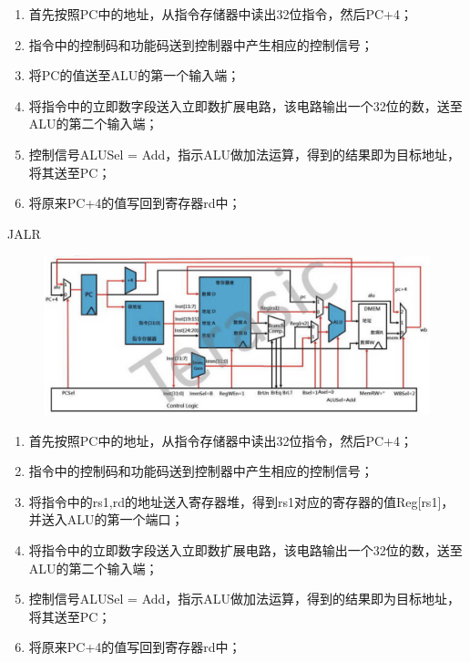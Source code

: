 \documentclass[a4paper, 14pt, oneside]{book} %
\numberwithin{equation}{subsection}
\begin{document}
\begin{enumerate}
\begin{enumerate}
\begin{figure}[!htbp]
							\end{figure}
							\begin{enumerate}
								\item
									首先按照PC中的地址，从指令存储器中读出32位指令，然后PC+4；
								\item
									指令中的控制码和功能码送到控制器中产生相应的控制信号；
								\item
									将PC的值送至ALU的第一个输入端；
								\item
									将指令中的立即数字段送入立即数扩展电路，该电路输出一个32位的数，送至ALU的第二个输入端；
								\item
									控制信号ALUSel = Add，指示ALU做加法运算，得到的结果即为目标地址，将其送至PC；
								\item 
									将原来PC+4的值写回到寄存器rd中；	
							\end{enumerate}
							\subitem
								JALR
							\begin{figure}[!htbp]
								\centering
								\includegraphics[scale=0.5]{img/j22.png}
							\end{figure}
							\begin{enumerate}
								\item
									首先按照PC中的地址，从指令存储器中读出32位指令，然后PC+4；
								\item
									指令中的控制码和功能码送到控制器中产生相应的控制信号；
								\item
									将指令中的rs1,rd的地址送入寄存器堆，得到rs1对应的寄存器的值Reg[rs1]，并送入ALU的第一个端口；
								\item
									将指令中的立即数字段送入立即数扩展电路，该电路输出一个32位的数，送至ALU的第二个输入端；
								\item
									控制信号ALUSel = Add，指示ALU做加法运算，得到的结果即为目标地址，将其送至PC；
								\item 
									将原来PC+4的值写回到寄存器rd中；	
							\end{enumerate}

\end{enumerate}
\end{enumerate}
\end{document}
